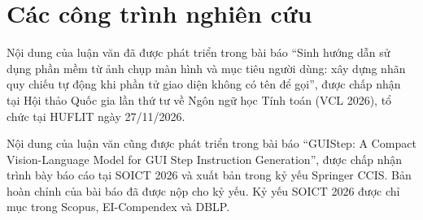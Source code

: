\chapter{Các công trình nghiên cứu}
\label{chap:8}

Nội dung của luận văn đã được phát triển trong bài báo “Sinh hướng dẫn sử dụng phần mềm từ ảnh chụp màn hình và mục tiêu người dùng: xây dựng nhãn quy chiếu tự động khi phần tử giao diện không có tên để gọi”, được chấp nhận tại Hội thảo Quốc gia lần thứ tư về Ngôn ngữ học Tính toán (VCL 2026), tổ chức tại HUFLIT ngày 27/11/2026.

Nội dung của luận văn cũng được phát triển trong bài báo “GUIStep: A Compact Vision-Language Model for GUI Step Instruction Generation”, được chấp nhận trình bày báo cáo tại SOICT 2026 và xuất bản trong kỷ yếu Springer CCIS. Bản hoàn chỉnh của bài báo đã được nộp cho kỷ yếu. Kỷ yếu SOICT 2026 được chỉ mục trong Scopus, EI-Compendex và DBLP.
